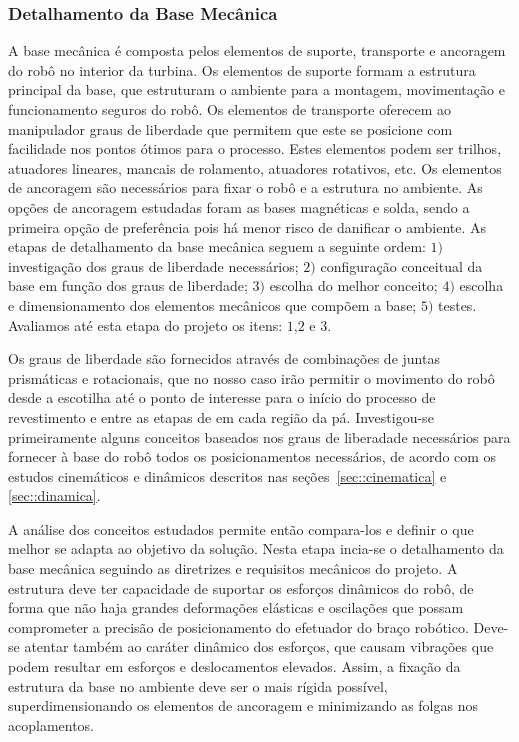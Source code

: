\subsubsection{Detalhamento da Base Mecânica}\label{sec::base_mec}
A base mecânica é composta pelos elementos de suporte, transporte e ancoragem do
robô no interior da turbina. Os elementos de suporte formam a estrutura
principal da base, que estruturam o ambiente para a montagem, movimentação e
funcionamento seguros do robô. Os elementos de transporte oferecem ao
manipulador graus de liberdade que permitem que este se posicione com facilidade
nos pontos ótimos para o processo. Estes elementos podem ser trilhos, atuadores
lineares, mancais de rolamento, atuadores rotativos, etc. Os elementos de
ancoragem são necessários para fixar o robô e a estrutura no ambiente. As
opções de ancoragem estudadas foram as bases magnéticas e solda, sendo a
primeira opção de preferência pois há menor risco de danificar o ambiente. As
etapas de detalhamento da base mecânica seguem a seguinte ordem: $1)$ investigação dos
graus de liberdade necessários; $2)$ configuração conceitual da base em função
dos graus de liberdade; $3)$ escolha do melhor conceito; $4)$ escolha e
dimensionamento dos elementos mecânicos que compõem a base; $5)$ testes.
Avaliamos até esta etapa do projeto os itens: $1$,$2$ e $3$.

Os graus de liberdade são fornecidos através de combinações de juntas
prismáticas e rotacionais, que no nosso caso irão permitir o movimento do robô
desde a escotilha até o ponto de interesse para o início do processo de
revestimento e entre as etapas de em cada região da pá.
Investigou-se primeiramente alguns conceitos baseados nos graus de liberadade 
necessários para fornecer à base do robô todos os posicionamentos necessários, 
de acordo com os estudos cinemáticos e dinâmicos descritos  nas
seções~\ref{sec::cinematica} e \ref{sec::dinamica}.

A análise dos conceitos estudados permite então compara-los e definir o que
melhor se adapta ao objetivo da solução. Nesta etapa incia-se o detalhamento da base
mecânica seguindo as diretrizes e requisitos mecânicos do projeto. A
estrutura deve ter capacidade de suportar os esforços dinâmicos do robô,
de forma que não haja grandes deformações elásticas e oscilações que possam
comprometer a precisão de posicionamento do efetuador do braço robótico.
Deve-se atentar também ao caráter dinâmico dos esforços, que causam vibrações
que podem resultar em esforços e deslocamentos elevados.
Assim, a fixação da estrutura da base no ambiente deve ser o mais rígida
possível, superdimensionando os elementos de ancoragem e minimizando as folgas
nos acoplamentos.

